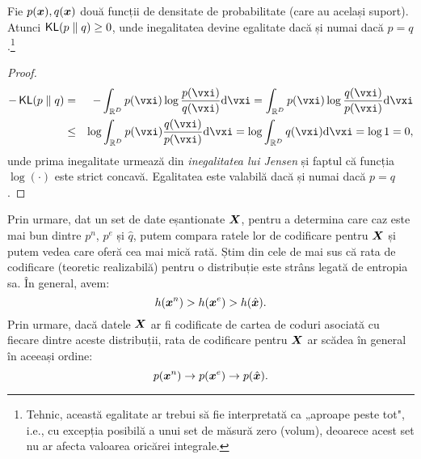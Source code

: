 \documentclass[../../book-main_ro.tex]{subfiles}
\begin{document}
\begin{theorem}\label{thm:information-inequality}
	Fie $p(\bm{x}), q(\bm{x})$ două funcții de densitate de probabilitate (care au același
	suport). Atunci $\operatorname{\mathsf{KL}}(p\;\|\; q) \ge 0$, unde inegalitatea devine egalitate dacă și numai dacă $p = q$.\footnote{Tehnic, această egalitate ar trebui să fie interpretată ca „aproape peste tot", i.e., cu excepția posibilă a unui set de măsură zero (volum), deoarece acest set nu ar afecta valoarea oricărei integrale.}
\end{theorem}
\begin{proof}
	\begin{eqnarray*}
		- \KL(p\mmid q)
		&=& - \int_{\R^{D}} p(\vxi) \log \frac{p(\vxi)}{q(\vxi)} \odif{\vxi}
		=  \int_{\R^{D}} p(\vxi) \log \frac{q(\vxi)}{p(\vxi)} \odif{\vxi} \\
		&\le& \log \int_{\R^{D}} p(\vxi)  \frac{q(\vxi)}{p(\vxi)} \odif{\vxi} \label{eqn:jensen-KL}
		= \log \int_{\R^{D}} q(\vxi) \odif{\vxi} = \log 1 = 0,
	\end{eqnarray*}
	unde prima inegalitate urmează din {\em inegalitatea lui Jensen} și
	faptul că funcția $\log(\cdot)$ este strict concavă. Egalitatea este valabilă
	dacă și numai dacă $p = q$ .
\end{proof}

Prin urmare, dat un set de date eșantionate $\bm{X}$, pentru a determina care caz este mai bun dintre $p^{n}$, $p^{e}$ și $\hat{q}$, putem compara ratele lor de codificare pentru $\bm{X}$ și putem vedea care oferă cea mai mică rată. Știm din cele de mai sus că rata de codificare (teoretic realizabilă) pentru o distribuție este strâns legată de entropia sa. În general, avem:
\begin{equation}
	h(\bm{x}^n) > h(\bm{x}^e) > h(\hat {\bm{x}}).
\end{equation}
Prin urmare, dacă datele $\bm{X}$ ar fi codificate de cartea de coduri asociată cu fiecare dintre aceste distribuții, rata de codificare pentru $\bm{X}$ ar scădea în general în aceeași ordine:
\begin{equation}
	p(\bm{x}^n) \rightarrow p(\bm{x}^e) \rightarrow p(\hat {\bm{x}}).
\end{equation}
\end{document}

